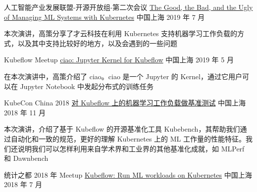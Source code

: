 
\begin{cventries}

  \cventry
    {人工智能产业发展联盟-开源开放组-第二次会议}
    {\href{https://docs.google.com/presentation/d/1lVmPF7KRtxi9DhBeRi4uU2NALtqNFTS6NhlLeuPDsrs/edit}{The Good, the Bad, and the Ugly of Managing ML Systems with Kubernetes}}
    {中国上海} %
    {2019 年 7 月} %
    {
      \begin{cvitems} %
        \item {
          本次演讲，高策分享了才云科技在利用 Kubernetes 支持机器学习工作负载的方式，以及其中支持比较好的地方，以及会遇到的一些问题
        }
      \end{cvitems}
    }

  \cventry
    {Kubeflow Meetup}
    {\href{https://docs.google.com/presentation/d/13imA6Ju9GndgKJPQTliCBySnWHXcMoAlSZzBi272hbw/edit}{ciao: Jupyter Kernel for Kubeflow}}
    {中国上海} %
    {2019 年 5 月} %
    {
      \begin{cvitems} %
        \item {
          在本次演讲中，高策介绍了 ciao。ciao 是一个 Jupyter 的 Kernel，通过它用户可以在 Jupyter Notebook 中发起分布式的训练任务
        }
      \end{cvitems}
    }

  \cventry
    {KubeCon China 2018}
    {\href{http://sched.co/FvLV}{对 Kubeflow 上的机器学习工作负载做基准测试}}
    {中国上海} %
    {2018 年 11 月} %
    {
      \begin{cvitems} %
        \item {
          本次演讲，介绍了基于 Kubeflow 的开源基准化工具 Kubebench，其帮助我们通过自动化和一致的规范，更好的理解 Kubernetes 上的 ML 工作量的性能特征。我们还说明我们可以怎样利用来自学术界和工业界的其他基准化成就，如 MLPerf 和 Dawnbench
        }
      \end{cvitems}
    }

  \cventry
    {统计之都 2018 年 Meetup}
    {\href{https://docs.google.com/presentation/d/1ED24TCnlBVzyJz0aCEAtXQQh0_W1RKSeapP3QZ0fTKA/edit?usp=sharing}{Kubeflow: Run ML workloads on Kubernetes}}
    {中国上海} %
    {2018 年 7 月} %
    {
    }


\end{cventries}
